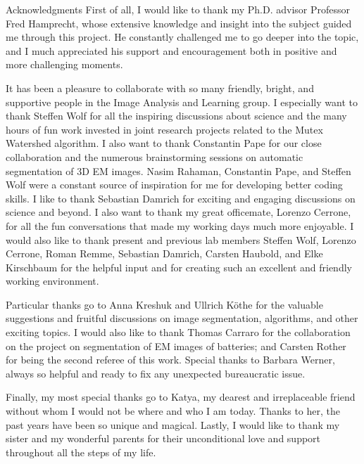 
\begin{coverpage}{Acknowledgments}
First of all, I would like to thank my Ph.D. advisor Professor Fred Hamprecht, whose extensive knowledge and insight into the subject guided me through this project. He constantly challenged me to go deeper into the topic, and I much appreciated his support and encouragement both in positive and more challenging moments.

It has been a pleasure to collaborate with so many friendly, bright, and supportive people in the Image Analysis and Learning group. I especially want to thank Steffen Wolf for all the inspiring discussions about science and the many hours of fun work invested in joint research projects related to the Mutex Watershed algorithm. I also want to thank Constantin Pape for our close collaboration and the numerous brainstorming sessions on automatic segmentation of 3D EM images. Nasim Rahaman, Constantin Pape, and Steffen Wolf were a constant source of inspiration for me for developing better coding skills. I like to thank Sebastian Damrich for exciting and engaging discussions on science and beyond. I also want to thank my great officemate, Lorenzo Cerrone, for all the fun conversations that made my working days much more enjoyable. I would also like to thank present and previous lab members Steffen Wolf, Lorenzo Cerrone, Roman Remme, Sebastian Damrich, Carsten Haubold, and Elke Kirschbaum for the helpful input and for creating such an excellent and friendly working environment.

Particular thanks go to Anna Kreshuk and Ullrich K\"othe for the valuable suggestions and fruitful discussions on image segmentation, algorithms, and other exciting topics. I would also like to thank Thomas Carraro for the collaboration on the project on segmentation of EM images of batteries; and Carsten Rother for being the second referee of this work. Special thanks to Barbara Werner, always so helpful and ready to fix any unexpected bureaucratic issue.

Finally, my most special thanks go to Katya, my dearest and irreplaceable friend without whom I would not be where and who I am today. Thanks to her, the past years have been so unique and magical. Lastly, I would like to thank my sister and my wonderful parents for their unconditional love and support throughout all the steps of my life.
\end{coverpage}
